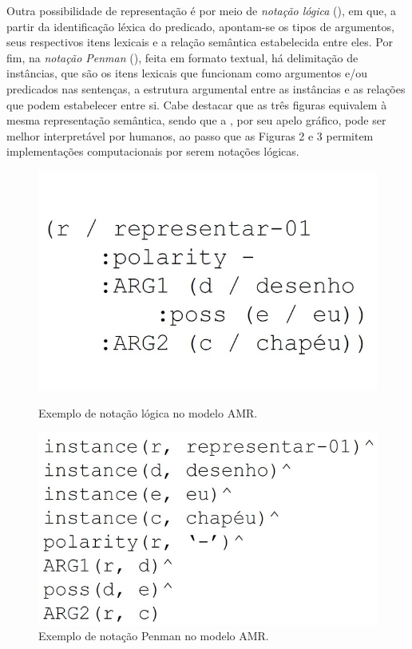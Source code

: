 Outra possibilidade de representação é por meio de \emph{notação lógica}
(), em que, a partir da identificação léxica do predicado,
apontam-se os tipos de argumentos, seus respectivos itens lexicais e a
relação semântica estabelecida entre eles. Por fim, na \emph{notação
Penman} (), feita em formato textual, há delimitação de
instâncias, que são os itens lexicais que funcionam como argumentos e/ou
predicados nas sentenças, a estrutura argumental entre as instâncias e
as relações que podem estabelecer entre si. Cabe destacar que as três
figuras equivalem à mesma representação semântica, sendo que a ,
por seu apelo gráfico, pode ser melhor interpretável por humanos, ao
passo que as Figuras 2 e 3 permitem implementações computacionais por
serem notações lógicas.

\begin{figure}[h]
\begin{minipage}{.45\textwidth}
  \centering
  \includegraphics[width=\textwidth]{figure02.jpg}
  \caption{Exemplo de notação lógica no modelo AMR.}
  \label{fig-02}
\end{minipage}%
\hfill
\begin{minipage}{.45\textwidth}
  \centering
 \includegraphics[width=\textwidth]{figure03.jpg}
  \caption{Exemplo de notação Penman no modelo AMR.}
  \label{fig-03}
\end{minipage}
\end{figure}

